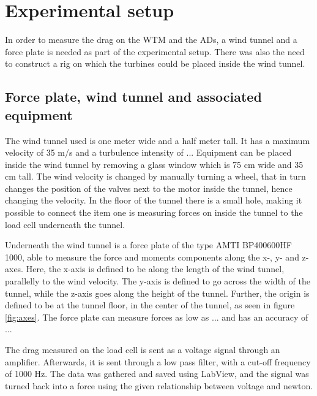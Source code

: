 \section{Experimental setup}

In order to measure the drag on the \gls{WTM} and the \gls{AD}s, a wind tunnel and a force plate is needed as part of the experimental setup. There was also the need to construct a rig on which the turbines could be placed inside the wind tunnel. 

\subsection{Force plate, wind tunnel and associated equipment}
The wind tunnel used is one meter wide and a half meter tall. It has a maximum velocity of 35 m/s and a turbulence intensity of ... Equipment can be placed inside the wind tunnel by removing a glass window which is 75 cm wide and 35 cm tall. The wind velocity is changed by manually turning a wheel, that in turn changes the position of the valves next to the motor inside the tunnel, hence changing the velocity. In the floor of the tunnel there is a small hole, making it possible to connect the item one is measuring forces on inside the tunnel to the load cell underneath the tunnel.  


Underneath the wind tunnel is a force plate of the type AMTI BP400600HF 1000, able to measure the force and moments components along the x-, y- and z-axes. Here, the x-axis is defined to be along the length of the wind tunnel, parallelly to the wind velocity. The y-axis is defined to go across the width of the tunnel, while the z-axis goes along the height of the tunnel. Further, the origin is defined to be at the tunnel floor, in the center of the tunnel, as seen in figure \ref{fig:axes}. The force plate can measure forces as low as ... and has an accuracy of ...  

The drag measured on the load cell is sent as a voltage signal through an amplifier. Afterwards, it is sent through a low pass filter, with a cut-off frequency of 1000 Hz. The data was gathered and saved using LabView, and the signal was turned back into a force using the given relationship between voltage and newton. 

